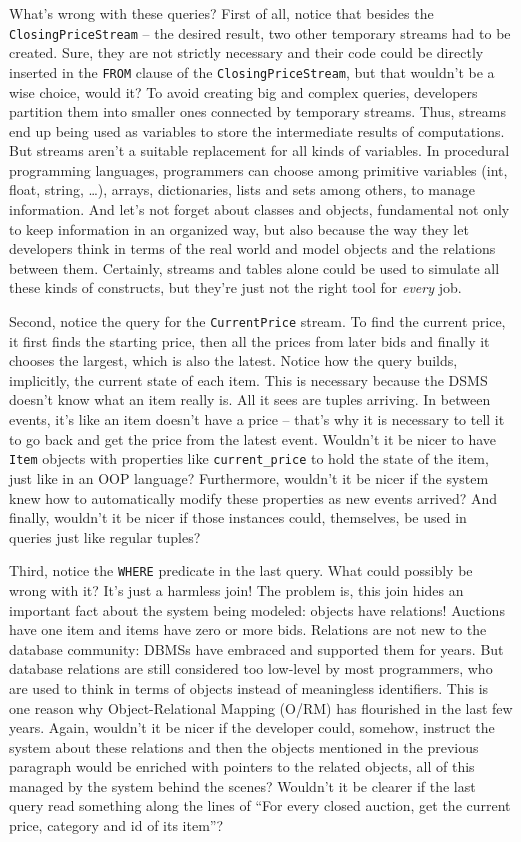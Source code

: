 \documentclass{report}
\begin{document}
What's wrong with these queries? First of all, notice that besides the \verb=ClosingPriceStream= -- the desired result, two other temporary streams had to be created. Sure, they are not strictly necessary and their code could be directly inserted in the \verb=FROM= clause of the \verb=ClosingPriceStream=, but that wouldn't be a wise choice, would it? To avoid creating big and complex queries, developers partition them into smaller ones connected by temporary streams. Thus, streams end up being used as variables to store the intermediate results of computations. But streams aren't a suitable replacement for all kinds of variables. In procedural programming languages, programmers can choose among primitive variables (int, float, string, \dots), arrays, dictionaries, lists and sets among others, to manage information. And let's not forget about classes and objects, fundamental not only to keep information in an organized way, but also because the way they let developers think in terms of the real world and model objects and the relations between them. Certainly, streams and tables alone could be used to simulate all these kinds of constructs, but they're just not the right tool for \emph{every} job.

Second, notice the query for the \verb=CurrentPrice= stream. To find the current price, it first finds the starting price, then all the prices from later bids and finally it chooses the largest, which is also the latest. Notice how the query builds, implicitly, the current state of each item. This is necessary because the DSMS doesn't know what an item really is. All it sees are tuples arriving. In between events, it's like an item doesn't have a price -- that's why it is necessary to tell it to go back and get the price from the latest event. Wouldn't it be nicer to have \verb=Item= objects with properties like \verb=current_price= to hold the state of the item, just like in an OOP language? Furthermore, wouldn't it be nicer if the system knew how to automatically modify these properties as new events arrived? And finally, wouldn't it be nicer if those instances could, themselves, be used in queries just like regular tuples?

Third, notice the \verb=WHERE= predicate in the last query. What could possibly be wrong with it? It's just a harmless join! The problem is, this join hides an important fact about the system being modeled: objects have relations! Auctions have one item and items have zero or more bids. Relations are not new to the database community: DBMSs have embraced and supported them for years. But database relations are still considered too low-level by most programmers, who are used to think in terms of objects instead of meaningless identifiers. This is one reason why Object-Relational Mapping (O/RM) has flourished in the last few years. Again, wouldn't it be nicer if the developer could, somehow, instruct the system about these relations and then the objects mentioned in the previous paragraph would be enriched with pointers to the related objects, all of this managed by the system behind the scenes? Wouldn't it be clearer if the last query read something along the lines of ``For every closed auction, get the current price, category and id of its item''?
\end{document}
